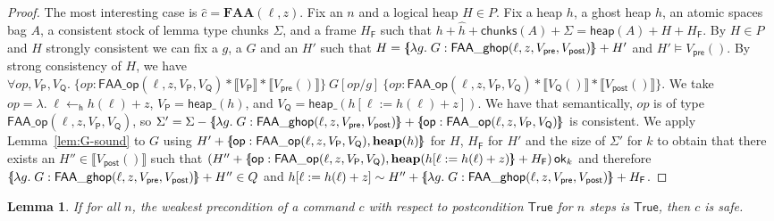 \documentclass{article}
\newtheorem{lemma}{Lemma}
\newcommand{\llbrace}{\{\hspace{-3pt}[}
\newcommand{\rrbrace}{]\hspace{-3pt}\}}
\begin{document}
\begin{proof}
The most interesting case is $\hat{c} = \mathbf{FAA}(\ell, z)$. Fix an $n$ and a logical heap $H \in P$. Fix a heap $h$, a ghost heap $\hat{h}$, an atomic spaces bag $A$, a consistent stock of lemma type chunks $\Sigma$, and a frame $H_\mathsf{F}$ such that $h + \hat{h} + \mathsf{chunks}(A) + \Sigma = \mathsf{heap}(A) + H + H_\mathsf{F}$. By $H \in P$ and $H$ strongly consistent we can fix a $g$, a $G$ and an $H'$ such that $H = \llbrace \lambda g.\;G : \mathsf{FAA\_ghop}(\ell, z, V_\mathsf{pre}, V_\mathsf{post})\rrbrace + H'$ and $H' \vDash V_\mathsf{pre}()$. By strong consistency of $H$, we have $\forall \mathit{op}, V_\mathsf{P}, V_\mathsf{Q}.\;\{\mathit{op} : \mathsf{FAA\_op}(\ell, z, V_\mathsf{P}, V_\mathsf{Q}) * \llbracket V_\mathsf{P}\rrbracket * \llbracket V_\mathsf{pre}()\rrbracket\}\ G[\mathit{op}/g]\ \{\mathit{op} : \mathsf{FAA\_op}(\ell, z, V_\mathsf{P}, V_\mathsf{Q}) * \llbracket V_\mathsf{Q}()\rrbracket * \llbracket V_\mathsf{post}()\rrbracket\}$. We take $\mathit{op} = \lambda.\;\ell \leftarrow_\mathsf{h} h(\ell) + z$, $V_\mathsf{P} = \mathsf{heap\_}(h)$, and $V_\mathsf{Q} = \mathsf{heap\_}(h[\ell := h(\ell) + z])$. We have that semantically, $\mathit{op}$ is of type $\mathsf{FAA\_op}(\ell, z, V_\mathsf{P}, V_\mathsf{Q})$, so $\Sigma' = \Sigma - \llbrace \lambda g.\;G : \mathsf{FAA\_ghop}(\ell, z, V_\mathsf{pre}, V_\mathsf{post})\rrbrace + \llbrace \mathsf{op} : \mathsf{FAA\_op}(\ell, z, V_\mathsf{P}, V_\mathsf{Q})\rrbrace$ is consistent. We apply Lemma~\ref{lem:G-sound} to $G$ using $H' + \llbrace \mathsf{op} : \mathsf{FAA\_op}(\ell, z, V_\mathsf{P}, V_\mathsf{Q}), \mathbf{heap}(h)\rrbrace$ for $H$, $H_\mathsf{F}$ for $H'$ and the size of $\Sigma'$ for $k$ to obtain that there exists an $H'' \in \llbracket V_\mathsf{post}()\rrbracket$ such that $(H'' + \llbrace \mathsf{op} : \mathsf{FAA\_op}(\ell, z, V_\mathsf{P}, V_\mathsf{Q}), \mathbf{heap}(h[\ell:=h(\ell) + z)\rrbrace + H_\mathsf{F})\,\mathsf{ok}_k$ and therefore $\llbrace \lambda g.\;G : \mathsf{FAA\_ghop}(\ell, z, V_\mathsf{pre}, V_\mathsf{post})\rrbrace + H'' \in Q$ and $h[\ell := h(\ell) + z] \sim H'' + \llbrace \lambda g.\;G : \mathsf{FAA\_ghop}(\ell, z, V_\mathsf{pre}, V_\mathsf{post})\rrbrace + H_\mathsf{F}$.
\end{proof}

\begin{lemma}
If for all $n$, the weakest precondition of a command $c$ with respect to postcondition $\mathsf{True}$ for $n$ steps is $\mathsf{True}$, then $c$ is safe.
\end{lemma}
\end{document}
